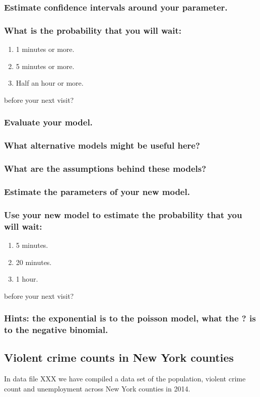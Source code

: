 \documentclass[11pt,fullpage]{book}
\begin{document}
\subsubsection{Estimate confidence intervals around your parameter.}
\subsubsection{What is the probability that you will wait:}
\begin{enumerate}
\item 1 minutes or more.
\item 5 minutes or more.
\item Half an hour or more.
\end{enumerate}
before your next visit?
\subsubsection{Evaluate your model.}
\subsubsection{What alternative models might be useful here?}
\subsubsection{What are the assumptions behind these models?}
\subsubsection{Estimate the parameters of your new model.}
\subsubsection{Use your new model to estimate the probability that you will wait:}
\begin{enumerate}
\item 5 minutes.
\item 20 minutes.
\item 1 hour.
\end{enumerate}
before your next visit?

\subsubsection{Hints: the exponential is to the poisson model, what the ? is to the negative binomial.}

\subsection{Violent crime counts in New York counties}
In data file XXX we have compiled a data set of the population, violent crime count and unemployment across New York counties in 2014. 
\end{document}
